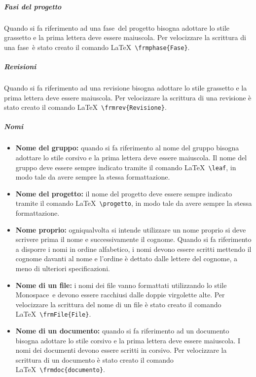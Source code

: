\documentclass[../NormeProgetto.text]{subfiles}
\begin{document}
			\subparagraph{Fasi del progetto}
				Quando si fa riferimento ad una fase\g\ del progetto bisogna adottare lo stile grassetto e la prima lettera deve essere maiuscola.	 Per velocizzare la scrittura di una fase\g\ è stato creato il comando \LaTeX\ \texttt{\textbackslash frmphase\{Fase\}}. 
			\subparagraph{Revisioni}
				Quando si fa riferimento ad una revisione bisogna adottare lo stile grassetto e la prima lettera deve essere maiuscola. Per velocizzare la scrittura di una revisione è stato creato il comando \LaTeX\ \texttt{\textbackslash frmrev\{Revisione\}}.
			

			\subparagraph{Nomi}
				\begin{itemize}
					\item \textbf{Nome del gruppo:} quando si fa riferimento al nome del gruppo bisogna adottare lo stile corsivo e la prima lettera deve essere maiuscola.	
					Il nome del gruppo deve essere sempre indicato tramite il comando \LaTeX\ \texttt{\textbackslash leaf}, in modo tale da avere sempre la stessa formattazione.
					\item \textbf{Nome del progetto:} il nome del progetto deve essere sempre indicato tramite il comando \LaTeX\ \texttt{\textbackslash progetto}, in modo tale da avere sempre la stessa formattazione.
					\item \textbf{Nome proprio:} ogniqualvolta si intende utilizzare un nome proprio si deve scrivere prima il nome e successivamente il cognome. Quando si fa riferimento a disporre i nomi in ordine alfabetico, i nomi devono essere scritti mettendo il cognome davanti al nome e l'ordine è dettato dalle lettere del cognome, a meno di ulteriori specificazioni.				
					\item \textbf{Nome di un file:} i nomi dei file vanno formattati utilizzando lo stile Monospace\g\ e devono essere racchiusi dalle doppie virgolette alte.  Per velocizzare la scrittura del nome di un file è stato creato il comando \LaTeX\ \texttt{\textbackslash frmFile\{File\}}.				
					\item \textbf{Nome di un documento:} quando si fa riferimento ad un documento bisogna adottare lo stile corsivo e la prima lettera deve essere maiuscola. I nomi dei documenti devono essere scritti in corsivo. Per velocizzare la scrittura di un documento è stato creato il comando \LaTeX\ \texttt{\textbackslash frmdoc\{documento\}}.				
				\end{itemize}
\end{document}
